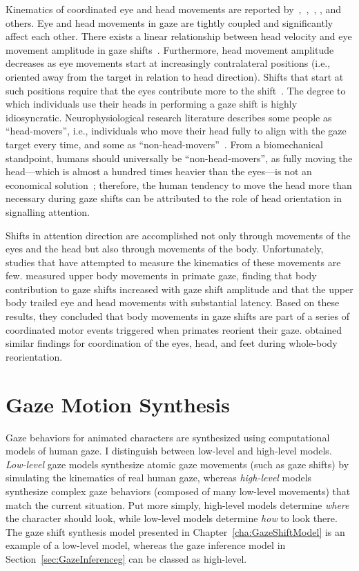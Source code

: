 Kinematics of coordinated eye and head movements are reported by~\citet{guitton1987gaze},~\citet{freedman2000coordination},~\citet{barnes1979vor}, \citet{uemura1980eyehead}, and others. Eye and head movements in gaze are tightly coupled and significantly affect each other. There exists a linear relationship between head velocity and eye movement amplitude in gaze shifts~\cite{barnes1979vor,uemura1980eyehead}. Furthermore, head movement amplitude decreases as eye movements start at increasingly contralateral positions (i.e., oriented away from the target in relation to head direction). Shifts that start at such positions require that the eyes contribute more to the shift~\cite{mccluskey2007monkeys}. The degree to which individuals use their heads in performing a gaze shift is highly idiosyncratic. Neurophysiological research literature describes some people as ``head-movers'', i.e., individuals who move their head fully to align with the gaze target every time, and some as ``non-head-movers''~\cite{fuller1992head}. From a biomechanical standpoint, humans should universally be ``non-head-movers'', as fully moving the head---which is almost a hundred times heavier than the eyes---is not an economical solution~\cite{kim2007head}; therefore, the human tendency to move the head more than necessary during gaze shifts can be attributed to the role of head orientation in signalling attention.

Shifts in attention direction are accomplished not only through movements of the eyes and the head but also through movements of the body. Unfortunately, studies that have attempted to measure the kinematics of these movements are few. \citet{mccluskey2007monkeys} measured upper body movements in primate gaze, finding that body contribution to gaze shifts increased with gaze shift amplitude and that the upper body trailed eye and head movements with substantial latency. Based on these results, they concluded that body movements in gaze shifts are part of a series of coordinated motor events triggered when primates reorient their gaze. \citet{hollands2004wholebody} obtained similar findings for coordination of the eyes, head, and feet during whole-body reorientation.

\section{Gaze Motion Synthesis}

Gaze behaviors for animated characters are synthesized using computational models of human gaze. I distinguish between low-level and high-level models. \emph{Low-level} gaze models synthesize atomic gaze movements (such as gaze shifts) by simulating the kinematics of real human gaze, whereas \emph{high-level} models synthesize complex gaze behaviors (composed of many low-level movements) that match the current situation. Put more simply, high-level models determine \emph{where} the character should look, while low-level models determine \emph{how} to look there. The gaze shift synthesis model presented in Chapter~\ref{cha:GazeShiftModel} is an example of a low-level model, whereas the gaze inference model in Section~\ref{sec:GazeInferenceg} can be classed as high-level.

